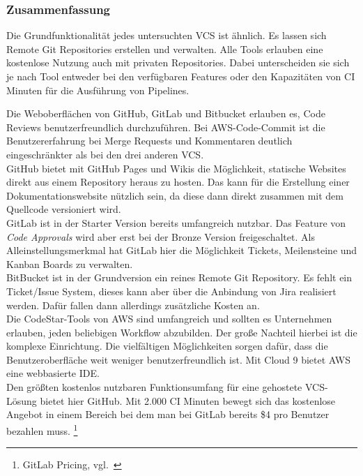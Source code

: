 \subsubsection{Zusammenfassung}\label{collaboration_vcs_zusammenfassung}

Die Grundfunktionalität jedes untersuchten VCS ist ähnlich.
Es lassen sich Remote Git Repositories erstellen und verwalten.
Alle Tools erlauben eine kostenlose Nutzung auch mit privaten Repositories.
Dabei unterscheiden sie sich je nach Tool entweder bei den verfügbaren Features
oder den Kapazitäten von CI Minuten für die Ausführung von Pipelines.

Die Weboberflächen von GitHub, GitLab und Bitbucket erlauben es, Code Reviews benutzerfreundlich durchzuführen.
Bei AWS-Code-Commit ist die Benutzererfahrung bei Merge Requests und Kommentaren deutlich eingeschränkter als bei den drei anderen VCS. \\

GitHub bietet mit GitHub Pages und Wikis die Möglichkeit, statische Websites direkt aus einem Repository heraus zu hosten.
Das kann für die Erstellung einer Dokumentationswebsite nützlich sein, da diese dann direkt zusammen mit dem Quellcode versioniert wird. \\

GitLab ist in der Starter Version bereits umfangreich nutzbar.
Das Feature von \textit{Code Approvals} wird aber erst bei der Bronze Version freigeschaltet.
Als Alleinstellungsmerkmal hat GitLab hier die Möglichkeit Tickets, Meilensteine und Kanban Boards zu verwalten. \\

BitBucket ist in der Grundversion ein reines Remote Git Repository.
Es fehlt ein Ticket/Issue System, dieses kann aber über die Anbindung von Jira realisiert werden.
Dafür fallen dann allerdings zusätzliche Kosten an. \\

Die CodeStar-Tools von AWS sind umfangreich und sollten es Unternehmen erlauben, jeden beliebigen Workflow abzubilden.
Der große Nachteil hierbei ist die komplexe Einrichtung.
Die vielfältigen Möglichkeiten sorgen dafür, dass die Benutzeroberfläche weit weniger benutzerfreundlich ist.
Mit Cloud 9 bietet AWS eine webbasierte IDE. \\

Den größten kostenlos nutzbaren Funktionsumfang für eine gehostete VCS-Lösung bietet hier GitHub.
Mit 2.000 CI Minuten bewegt sich das kostenlose Angebot in einem Bereich bei dem man bei GitLab bereits \$4 pro Benutzer bezahlen muss.
\footnote{GitLab Pricing, vgl.~\cite{GITLAB_PRICING}}